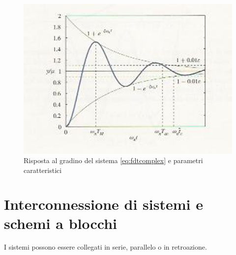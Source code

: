 \documentclass[a4paper]{report}
\begin{document}
\begin{figure}[!h]
  \begin{center}
    \includegraphics[scale=0.5]{./figures/rispscalX.png}
    \caption{Risposta al gradino del sistema \ref{eq:fdtcomplex} e
      parametri caratteristici}\label{fig:rispX}
  \end{center}
\end{figure} 

\chapter{Interconnessione di sistemi e schemi a blocchi}
I sistemi possono essere collegati in serie, parallelo o in retroazione.
\end{document}
